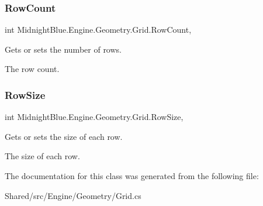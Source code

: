 \subsubsection{\texorpdfstring{Row\+Count}{RowCount}}
{\footnotesize\ttfamily int Midnight\+Blue.\+Engine.\+Geometry.\+Grid.\+Row\+Count\hspace{0.3cm}{\ttfamily [get]}, {\ttfamily [set]}}



Gets or sets the number of rows. 

The row count.\hypertarget{class_midnight_blue_1_1_engine_1_1_geometry_1_1_grid_a99b20b74d0b2b60f3358aa6f3cdecc1d}{}\label{class_midnight_blue_1_1_engine_1_1_geometry_1_1_grid_a99b20b74d0b2b60f3358aa6f3cdecc1d} 
\subsubsection{\texorpdfstring{Row\+Size}{RowSize}}
{\footnotesize\ttfamily int Midnight\+Blue.\+Engine.\+Geometry.\+Grid.\+Row\+Size\hspace{0.3cm}{\ttfamily [get]}, {\ttfamily [set]}}



Gets or sets the size of each row. 

The size of each row.

The documentation for this class was generated from the following file\+:\begin{DoxyCompactItemize}
\item 
Shared/src/\+Engine/\+Geometry/Grid.\+cs\end{DoxyCompactItemize}

